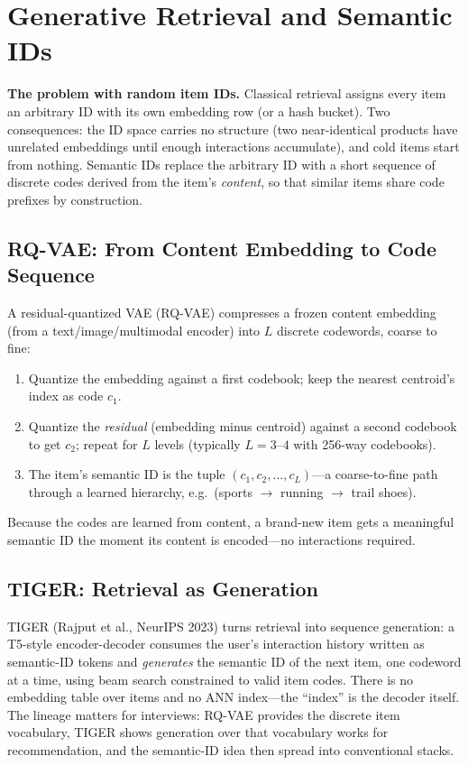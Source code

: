 \section{Generative Retrieval and Semantic IDs}
\label{sr:sec:semantic_ids}

\textbf{The problem with random item IDs.} Classical retrieval assigns every item an arbitrary ID with its own embedding row (or a hash bucket). Two consequences: the ID space carries no structure (two near-identical products have unrelated embeddings until enough interactions accumulate), and cold items start from nothing. Semantic IDs replace the arbitrary ID with a short sequence of discrete codes derived from the item's \textit{content}, so that similar items share code prefixes by construction.

\subsection{RQ-VAE: From Content Embedding to Code Sequence}

A residual-quantized VAE (RQ-VAE) compresses a frozen content embedding (from a text/image/multimodal encoder) into $L$ discrete codewords, coarse to fine:
\begin{enumerate}
    \item Quantize the embedding against a first codebook; keep the nearest centroid's index as code $c_1$.
    \item Quantize the \textit{residual} (embedding minus centroid) against a second codebook to get $c_2$; repeat for $L$ levels (typically $L = 3$--$4$ with 256-way codebooks).
    \item The item's semantic ID is the tuple $(c_1, c_2, \ldots, c_L)$---a coarse-to-fine path through a learned hierarchy, e.g.\ (sports $\rightarrow$ running $\rightarrow$ trail shoes).
\end{enumerate}
Because the codes are learned from content, a brand-new item gets a meaningful semantic ID the moment its content is encoded---no interactions required.

\subsection{TIGER: Retrieval as Generation}

TIGER (Rajput et al., NeurIPS 2023) turns retrieval into sequence generation: a T5-style encoder-decoder consumes the user's interaction history written as semantic-ID tokens and \textit{generates} the semantic ID of the next item, one codeword at a time, using beam search constrained to valid item codes. There is no embedding table over items and no ANN index---the ``index'' is the decoder itself. The lineage matters for interviews: RQ-VAE provides the discrete item vocabulary, TIGER shows generation over that vocabulary works for recommendation, and the semantic-ID idea then spread into conventional stacks.

